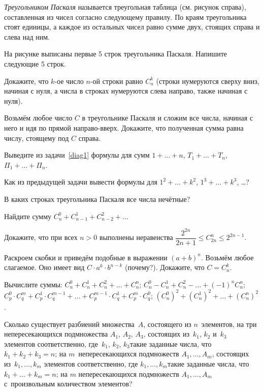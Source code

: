 \documentclass[a4paper,12pt,fleqn]{article}
\begin{document}
\emph{Треугольником Паскаля} называется треугольная таблица (см. рисунок справа), составленная из чисел согласно следующему правилу. По краям треугольника стоят единицы, а каждое из остальных чисел равно сумме двух, стоящих справа и слева над ним.

На рисунке выписаны первые 5 строк треугольника Паскаля. Напишите следующие 5 строк.

Докажите, что $k$-ое число $n$-ой строки равно $C_n^k$
(строки нумеруются сверху вниз, начиная с нуля,
а числа в строках нумеруются слева направо, также начиная с нуля).

\label{diag1}
Возьмём любое число $C$ в треугольнике Паскаля и сложим все числа, начиная с него и идя по прямой направо-вверх. Докажите, что полученная сумма равна числу, стоящему под $C$ справа.


Выведите из задачи~\ref{diag1} формулы для сумм $1+\ldots+n$, $T_1+\ldots+T_n$, $\Pi_1+\ldots+\Pi_n$.

Как из предыдущей задачи вывести формулы для  $1^2+\ldots+k^2$, $1^3+\ldots+k^3$, \ldots?

В каких строках треугольника Паскаля все числа нечётные?

Найдите сумму $C_n^0 + C_{n-1}^1 + C_{n-2}^2 + \ldots$

Докажите, что при всех $n > 0$ выполнены неравенства $\dfrac{2^{2n}}{2n+1} \le C_{2n}^n \le 2^{2n-1}$.

Раскроем скобки и приведём подобные в выражении $(a+b)^n$. Возьмём любое слагаемое. Оно имеет вид $C\cdot a^k\cdot b^{n-k}$ (почему?). Докажите, что $C=C_n^k$.

Вычислите суммы:
$C_n^0+C_n^1+C_n^2+\ldots+C_n^n$;
$C_n^0-C_n^1+C_n^2-\ldots+(-1)^n C_n^n$;\\
$C_p^0\cdot C_q^m+C_p^1\cdot C_q^{m-1}+\ldots+C_p^{m-1}\cdot C_q^1
+C_p^m\cdot C_q^0$;
$(C_n^0)^2+(C_n^1)^2+\ldots+(C_n^n)^2$.

Сколько существует разбиений множества~$A$, состоящего из $n$~элементов,
на три непересекающихся подмножества $A_1$, $A_2$, $A_3$, состоящих из~$k_1$, $k_2$ и~$k_3$ элементов соответственно, где~$k_1$, $k_2$, $k_3$\т такие заданные числа, что $k_1+k_2+k_3=n$;
на $m$~непересекающихся подмножеств $A_1,\ldots, A_m$, состоящих из~$k_1,\ldots, k_m$ элементов соответственно, где $k_1,\ldots, k_m$\т такие заданные числа, что $k_1+\ldots+k_m=n$;
на $m$ непересекающихся подмножеств $A_1,\ldots, A_m$ с~произвольным количеством элементов?






\end{document}
